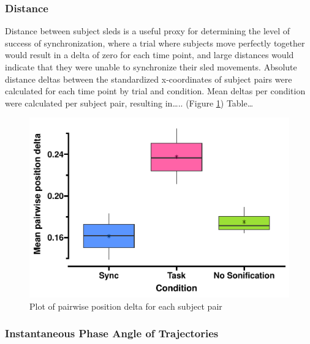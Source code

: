 \documentclass[10pt,a4paper,onecolumn]{article}
\begin{document}
\hypertarget{distance}{%
\subsubsection{Distance}\label{distance}}

Distance between subject sleds is a useful proxy for determining the level of success of synchronization, where a trial where subjects move perfectly together would result in a delta of zero for each time point, and large distances would indicate that they were unable to synchronize their sled movements. Absolute distance deltas between the standardized x-coordinates of subject pairs were calculated for each time point by trial and condition. Mean deltas per condition were calculated per subject pair, resulting in\ldots.. (Figure \ref{fig:pairwise-position-delta})
Table\ldots{}

\begin{figure}

{\centering \includegraphics[width=1\linewidth]{CogSci_Bachelor_Thesis_files/figure-latex/pairwise-position-delta-1} 

}

\caption{Plot of pairwise position delta for each subject pair}\label{fig:pairwise-position-delta}
\end{figure}

\hypertarget{instantaneous-phase-angle-of-trajectories}{%
\subsubsection{Instantaneous Phase Angle of Trajectories}\label{instantaneous-phase-angle-of-trajectories}}
\end{document}
